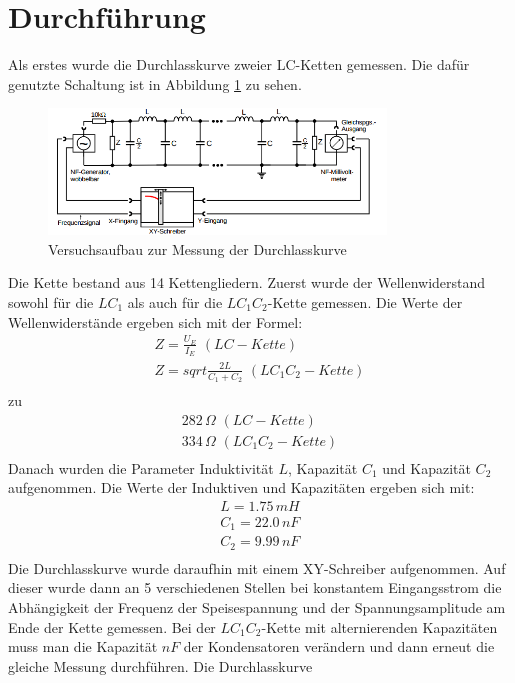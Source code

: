 \documentclass[
  bibliography=totoc,     %
  captions=tableheading,  %
  titlepage=firstiscover, %
]{scrartcl}
\begin{document}
\section{Durchführung}
\label{durchführung}
Als erstes wurde die Durchlasskurve zweier LC-Ketten gemessen. Die dafür genutzte
Schaltung ist in Abbildung \ref{fig:V3561} zu sehen.
\begin{figure}[htb]
  \centering
  \includegraphics[width=0.8\textwidth]{V3561.png}
  \caption{Versuchsaufbau zur Messung der Durchlasskurve}
  \label{fig:V3561}
\end{figure}
Die Kette bestand aus 14 Kettengliedern. Zuerst wurde der Wellenwiderstand
sowohl für die $LC_1$ als auch für die $LC_1C_2$-Kette gemessen. Die Werte
der Wellenwiderstände ergeben sich mit der Formel:
\begin{align}
  Z=\frac{U_E}{I_E}\,\,(LC-Kette) \\
  Z=sqrt{\frac{2L}{C_1+C_2}}\,\,(LC_1C_2-Kette) \\
\end{align}
zu
\begin{align}
  282\,\Omega\,\,(LC-Kette) \\
  334\,\Omega\,\,(LC_1C_2-Kette) \\
\end{align}
Danach wurden
die Parameter Induktivität $L$, Kapazität $C_1$ und Kapazität $C_2$ aufgenommen.
Die Werte der Induktiven und Kapazitäten ergeben sich mit:
\begin{align}
  L=1.75\,mH \\
  C_1=22.0\,nF \\
  C_2=9.99\,nF \\
\end{align}
Die Durchlasskurve wurde daraufhin mit einem XY-Schreiber aufgenommen. Auf
dieser wurde dann an 5 verschiedenen Stellen bei konstantem Eingangsstrom die
Abhängigkeit der Frequenz der Speisespannung und der Spannungsamplitude am Ende
der Kette gemessen.
Bei der $LC_1C_2$-Kette mit alternierenden Kapazitäten muss man die Kapazität $nF$ der Kondensatoren
verändern und dann erneut die gleiche Messung durchführen. Die Durchlasskurve
\end{document}
